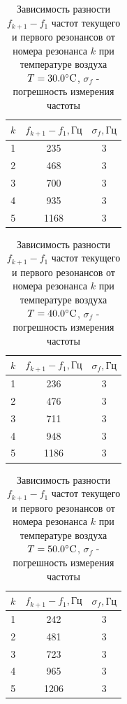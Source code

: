 \begin{table}[h]
    \centering
    \begin{tabular}{|c|c|c|}
    \hline
    $k$ & $f_{k+1} - f_1, \text{Гц}$ & $\sigma_f, \text{Гц}$  \\ \hline
    1   & 235                        & 3  \\ \hline
    2   & 468                        & 3  \\ \hline
    3   & 700                        & 3  \\ \hline
    4   & 935                        & 3  \\ \hline
    5   & 1168                       & 3  \\ \hline
\end{tabular}
    \caption{Зависимость разности $f_{k+1} - f_1$ частот текущего и первого резонансов от номера резонанса $k$ при температуре воздуха $T = 30.0\celsius$, $\sigma_f$ - погрешность измерения частоты}
    \label{tab:t6}
\end{table}

\begin{table}[h]
    \centering
    \begin{tabular}{|c|c|c|}
    \hline
    $k$ & $f_{k+1} - f_1, \text{Гц}$ & $\sigma_f, \text{Гц}$  \\ \hline
    1   & 236                        & 3  \\ \hline
    2   & 476                        & 3  \\ \hline
    3   & 711                        & 3  \\ \hline
    4   & 948                        & 3  \\ \hline
    5   & 1186                       & 3  \\ \hline
\end{tabular}
    \caption{Зависимость разности $f_{k+1} - f_1$ частот текущего и первого резонансов от номера резонанса $k$ при температуре воздуха $T = 40.0\celsius$, $\sigma_f$ - погрешность измерения частоты}
    \label{tab:t7}
\end{table}
\newpage
\begin{table}[h]
    \centering
    \begin{tabular}{|c|c|c|}
    \hline
    $k$ & $f_{k+1} - f_1, \text{Гц}$ & $\sigma_f, \text{Гц}$  \\ \hline
    1   & 242                        & 3  \\ \hline
    2   & 481                        & 3  \\ \hline
    3   & 723                        & 3  \\ \hline
    4   & 965                        & 3  \\ \hline
    5   & 1206                       & 3  \\ \hline
\end{tabular}
    \caption{Зависимость разности $f_{k+1} - f_1$ частот текущего и первого резонансов от номера резонанса $k$ при температуре воздуха $T = 50.0\celsius$, $\sigma_f$ - погрешность измерения частоты}
    \label{tab:t8}
\end{table}

